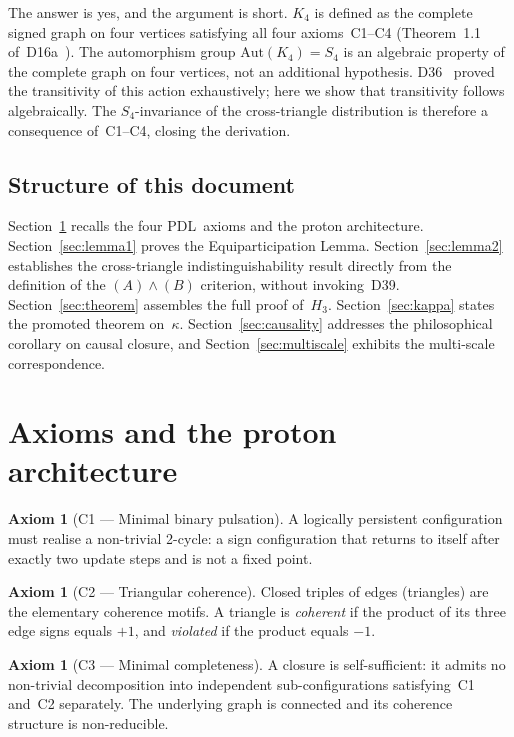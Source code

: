 \documentclass[11pt,a4paper]{article}
\theoremstyle{plain}
\theoremstyle{definition}
\newtheorem{axiom}[theorem]{Axiom}
\theoremstyle{remark}
\newcommand{\PDL}{\textnormal{PDL}}
\newcommand{\Kfour}{K_4}
\newcommand{\kap}{\kappa}
\begin{document}
The answer is yes, and the argument is short. $\Kfour$ is defined as the complete signed graph on four vertices satisfying all four axioms~C1--C4 (Theorem~1.1 of~D16a~\cite{PDL_D16a_2026}). The automorphism group $\mathrm{Aut}(\Kfour) = S_4$ is an algebraic property of the complete graph on four vertices, not an additional hypothesis. D36~\cite{PDL_D36_2026} proved the transitivity of this action exhaustively; here we show that transitivity follows algebraically. The $S_4$-invariance of the cross-triangle distribution is therefore a consequence of~C1--C4, closing the derivation.

\subsection{Structure of this document}

Section~\ref{sec:axioms} recalls the four \PDL\ axioms and the proton architecture. Section~\ref{sec:lemma1} proves the Equiparticipation Lemma. Section~\ref{sec:lemma2} establishes the cross-triangle indistinguishability result directly from the definition of the $(A)\wedge(B)$ criterion, without invoking~D39. Section~\ref{sec:theorem} assembles the full proof of~$H_3$. Section~\ref{sec:kappa} states the promoted theorem on~$\kap$. Section~\ref{sec:causality} addresses the philosophical corollary on causal closure, and Section~\ref{sec:multiscale} exhibits the multi-scale correspondence.

\section{Axioms and the proton architecture}
\label{sec:axioms}

\begin{axiom}[C1 --- Minimal binary pulsation]
A logically persistent configuration must realise a non-trivial 2-cycle: a sign configuration that returns to itself after exactly two update steps and is not a fixed point.
\end{axiom}

\begin{axiom}[C2 --- Triangular coherence]
Closed triples of edges (triangles) are the elementary coherence motifs. A triangle is \emph{coherent} if the product of its three edge signs equals $+1$, and \emph{violated} if the product equals $-1$.
\end{axiom}

\begin{axiom}[C3 --- Minimal completeness]
A closure is self-sufficient: it admits no non-trivial decomposition into independent sub-configurations satisfying~C1 and~C2 separately. The underlying graph is connected and its coherence structure is non-reducible.
\end{axiom}
\end{document}
